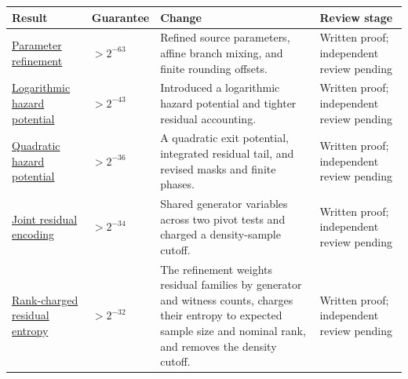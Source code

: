 \documentclass[11pt]{article}
\begin{document}
{\def\LTcaptype{none} %
\begin{longtable}[]{@{}
  >{\raggedright\arraybackslash}p{}
  >{\raggedleft\arraybackslash}p{}
  >{\raggedright\arraybackslash}p{}
  >{\raggedright\arraybackslash}p{}@{}}
\toprule\noalign{}
\begin{minipage}[b]{\linewidth}\raggedright
Result
\end{minipage} & \begin{minipage}[b]{\linewidth}\raggedleft
Guarantee
\end{minipage} & \begin{minipage}[b]{\linewidth}\raggedright
Change
\end{minipage} & \begin{minipage}[b]{\linewidth}\raggedright
Review stage
\end{minipage} \\
\midrule\noalign{}
\endhead
\bottomrule\noalign{}
\endlastfoot
\href{https://github.com/shea256/matroid-prophet-inequality/blob/master/results/parameter-refinement.md}{Parameter refinement} & \(>2^{-63}\) & Refined source parameters, affine branch mixing, and finite rounding offsets. & Written proof; independent review pending \\
\href{https://github.com/shea256/matroid-prophet-inequality/blob/master/results/logarithmic-hazard.md}{Logarithmic hazard potential} & \(>2^{-43}\) & Introduced a logarithmic hazard potential and tighter residual accounting. & Written proof; independent review pending \\
\href{https://github.com/shea256/matroid-prophet-inequality/blob/master/results/quadratic-hazard.md}{Quadratic hazard potential} & \(>2^{-36}\) & A quadratic exit potential, integrated residual tail, and revised masks and finite phases. & Written proof; independent review pending \\
\href{https://github.com/shea256/matroid-prophet-inequality/blob/master/results/joint-residual.md}{Joint residual encoding} & \(>2^{-34}\) & Shared generator variables across two pivot tests and charged a density-sample cutoff. & Written proof; independent review pending \\
\href{https://github.com/shea256/matroid-prophet-inequality/blob/master/results/rank-charged.md}{Rank-charged residual entropy} & \(>2^{-32}\) & The refinement weights residual families by generator and witness counts, charges their entropy to expected sample size and nominal rank, and removes the density cutoff. & Written proof; independent review pending \\

\end{longtable}}
\end{document}
